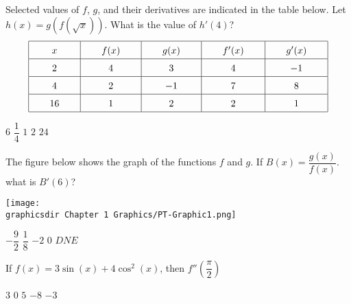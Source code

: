 \begin{questions}
    \newpage

    \question Selected values of $f$, $g$, and their derivatives are indicated in the table below. Let $h(x) = g\left(f\left(\sqrt{x}\right)\right)$. What is the value of $h'(4)$? \begin{align*}
        \arraycolsep=22pt\def\arraystretch{1.5} 
        \begin{array}{|c|c|c|c|c|}
            \hline
            x & f(x) & g(x) & f'(x) & g'(x) \\ \hline
            2 & 4 & 3 & 4 & -1 \\ \hline
            4 & 2 & -1 & 7 & 8 \\ \hline
            16 & 1 & 2 & 2 & 1 \\
            \hline
        \end{array}
    \end{align*}

    \begin{oneparchoices}
        \choice $6$
        \choice $\dfrac{1}{4}$
        \choice $1$
        \choice $2$
        \choice $24$
    \end{oneparchoices} \par \horizontalline

    \question The figure below shows the graph of the functions $f$ and $g$. If $B(x) = \dfrac{g(x)}{f(x)}$. what is $B'(6)$?
    \begin{center}
        \texttt{[image: \\graphicsdir Chapter 1 Graphics/PT-Graphic1.png]}
    \end{center} \vspace{11pt}

    \begin{oneparchoices}
        \choice $-\dfrac{9}{2}$
        \choice $\dfrac{1}{8}$
        \choice $-2$
        \choice $0$
        \choice $DNE$
    \end{oneparchoices} \par \horizontalline

    \question If $f(x) = 3\sin (x) + 4\cos^2 (x)$, then $f''\left(\dfrac{\pi}{2}\right)$ \\

    \begin{oneparchoices}
        \choice $3$
        \choice $0$
        \choice $5$
        \choice $-8$
        \choice $-3$
    \end{oneparchoices} \par \horizontalline


\end{questions}

